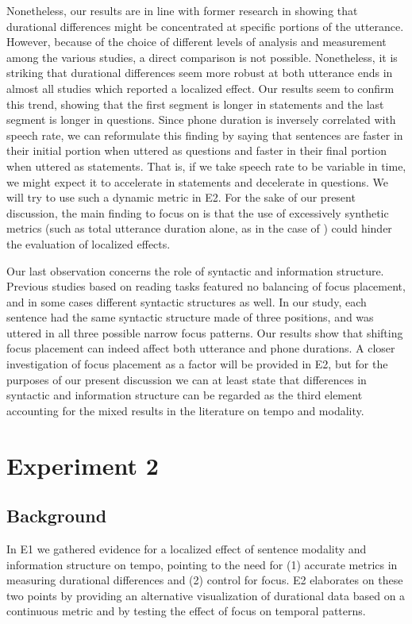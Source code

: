 Nonetheless, our results are in line with former research in showing that durational differences might be concentrated at specific portions of the utterance. However, because of the choice of different levels of analysis and measurement among the various studies, a direct comparison is not possible. Nonetheless, it is  striking that durational differences seem more robust at both utterance ends in almost all studies which reported a localized effect. Our results seem to confirm this trend, showing that the first segment is longer in statements and the last segment is longer in questions. Since phone duration is inversely correlated with speech rate, we can reformulate this finding by saying that sentences are faster in their initial portion when uttered as questions and faster in their final portion when uttered as statements. That is, if we take speech rate to be variable in time, we might expect it to accelerate in statements and decelerate in questions. We will try to use such a dynamic metric in E2. For the sake of our present discussion, the main finding to focus on is that the use of excessively synthetic metrics (such as total utterance duration alone, as in the case of \citealt{maturi1988intonazione}) could hinder the evaluation of localized effects.

Our last observation concerns the role of syntactic and information structure. Previous studies based on reading tasks featured no balancing of focus placement, and in some cases different syntactic structures as well. In our study, each sentence had the same syntactic structure made of three positions, and was uttered in all three possible narrow focus patterns. Our results show that shifting focus placement can indeed affect both utterance and phone durations. A closer investigation of focus placement as a factor will be provided in E2, but for the purposes of our present discussion we can at least state that differences in syntactic and information structure can be regarded as the third element accounting for the mixed results in the literature on tempo and modality.

\section{Experiment 2}\label{sec44}
\subsection{Background}\label{sec440}
In E1 we gathered evidence for a localized effect of sentence modality and information structure on tempo, pointing to the need for (1) accurate metrics in measuring durational differences and (2) control for focus. E2 elaborates on these two points by providing an alternative visualization of durational data based on a continuous metric and by testing the effect of focus on temporal patterns.


